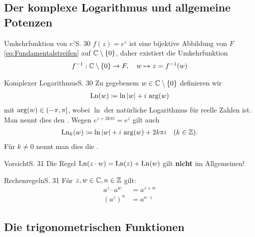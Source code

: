 \subsection{Der komplexe Logarithmus und allgemeine Potenzen}

\begin{bemerkung}{Umkehrfunktion von $e^z$}{S. 30}
  $f(z) = e^z$ ist eine bijektive Abbildung von $F$ \eqref{eq:Fundamentalstreifen} auf $\mathbb{C} \setminus \{ 0 \}$, daher existiert die Umkehrfunktion
  \begin{align}
    f^{-1} : \mathbb{C} \setminus \{ 0 \} \to F, \quad w \mapsto z = f^{-1}(w)
  \end{align}
\end{bemerkung}

\begin{bemerkung}{Komplexer Logarithmus}{S. 30}
  Zu gegebenem $w \in \mathbb{C}\setminus\{0\}$ definieren wir
  \begin{align}
    \operatorname{Ln}(w) \coloneqq \ln |w| + i \, \operatorname{arg}(w)
  \end{align}
  mit $\operatorname{arg}(w) \in (-\pi,\pi]$, wobei $\ln$ der natürliche Logarithmus für reelle Zahlen ist.
  Man nennt dies den .
  Wegen $e^{z + 2 k \pi i} = e^z$ gilt auch
  \begin{align}
    \operatorname{Ln}_k(w) \coloneqq \ln |w| + i \, \operatorname{arg}(w) + 2 k \pi i \quad (k \in \mathbb{Z}) .
  \end{align}
  Für $k \neq 0$ nennt man dies die .
\end{bemerkung}

\begin{bemerkung}{Vorsicht}{S. 31}
  Die Regel $\operatorname{Ln}(z \cdot w) = \operatorname{Ln}(z) + \operatorname{Ln}(w)$ gilt \textbf{nicht} im Allgemeinen!
\end{bemerkung}

\begin{bemerkung}{Rechenregeln}{S. 31}
  Für $z, w \in \mathbb{C}, n \in \mathbb{Z}$ gilt:
  \begin{align}
    a^z \cdot a^w &= a^{z+w}\\
    \left( a^z \right)^n &= a^{n \cdot z}
  \end{align}
\end{bemerkung}



\subsection{Die trigonometrischen Funktionen}

